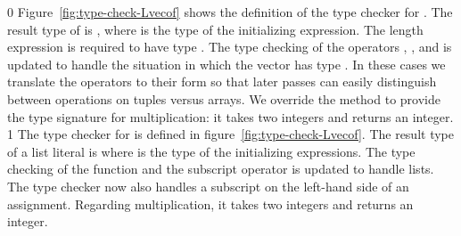 \documentclass[7x10]{TimesAPriori_MIT}%
\def\racketEd{0}
\def\pythonEd{1}
\def\edition{0}
\numberwithin{theorem}{chapter}
\numberwithin{definition}{chapter}
\numberwithin{equation}{chapter}
\begin{document}
{\if\edition\racketEd
%
Figure~\ref{fig:type-check-Lvecof} shows the definition of the type
checker for \LangArray{}. The result type of
 is , where  is the type
of the initializing expression.  The length expression is required to
have type . The type checking of the operators
, , and   is
updated to handle the situation in which the vector has type
. In these cases we translate the operators to their
 form so that later passes can easily distinguish
between operations on tuples versus arrays. We override the
 method to provide the type signature for
multiplication: it takes two integers and returns an integer.  \fi}
{\if\edition\pythonEd
%
The type checker for \LangArray{} is defined in
figure~\ref{fig:type-check-Lvecof}. The result type of a list literal
is  where  is the type of the initializing
expressions.  The type checking of the  function and the
subscript operator is updated to handle lists. The type checker now
also handles a subscript on the left-hand side of an assignment.
Regarding multiplication, it takes two integers and returns an
integer.
%
\fi}
\end{document}
